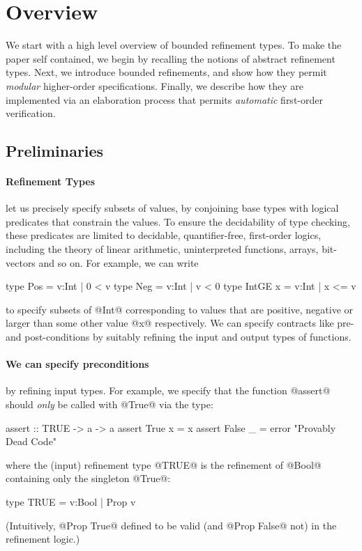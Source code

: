 \section{Overview}\label{sec:boundedrefinementtypes:overview}

We start with a high level overview of bounded refinement types.
To make the paper self contained, we begin by recalling the notions
of abstract refinement types. Next, we introduce bounded refinements,
and show how they permit \emph{modular} higher-order specifications.
Finally, we describe how they are implemented via an elaboration
process that permits \emph{automatic} first-order verification.

\subsection{Preliminaries} 

\paragraph{Refinement Types} let us precisely specify subsets 
of values, by conjoining base types with logical predicates 
that constrain the values.  To ensure the decidability of 
type checking, these predicates are limited to decidable, 
quantifier-free, first-order logics, including the theory 
of linear arithmetic, uninterpreted functions, arrays, 
bit-vectors and so on. For example, we can write
%
\begin{code}
    type Pos     = {v:Int | 0 < v}
    type Neg     = {v:Int | v < 0}
    type IntGE x = {v:Int | x <= v} 
\end{code}
%
to specify subsets of @Int@ corresponding to values that are 
positive, negative or larger than some other value @x@ respectively.
We can specify contracts like pre- and post-conditions by 
suitably refining the input and output types of functions. 

\paragraph{We can specify preconditions} by refining input types.
For example, we specify that the function @assert@ should 
\emph{only} be called with @True@ via the type:
%
\begin{code}
    assert         :: TRUE -> a -> a
    assert True x  = x
    assert False _ = error "Provably Dead Code"
\end{code}
%
where the (input) refinement type @TRUE@ is the refinement 
of @Bool@ containing only the singleton @True@:
%
\begin{code}
    type TRUE = {v:Bool | Prop v}
\end{code}
%
(Intuitively, @Prop True@ defined to be valid (and @Prop False@ not) 
in the refinement logic.)

